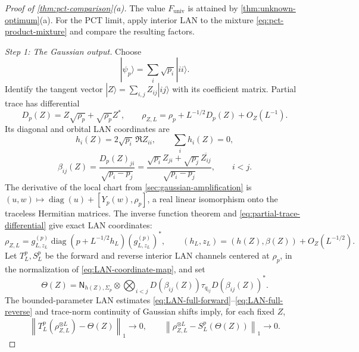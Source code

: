 \documentclass[11pt]{article}
\theoremstyle{remark}
\theoremstyle{plain}
\newcommand{\diag}{\operatorname{diag}}
\newcommand{\ket}[1]{|#1\rangle}
\newcommand{\ot}{\otimes}
\newcommand{\Funiv}{F_{\mathrm{univ}}}
\begin{document}
\begin{proof}[Proof of \cref{thm:pct-comparison}\textup{(a)}]
The value \(\Funiv\) is attained by \cref{thm:unknown-optimum}\textup{(a)}.
For the PCT limit, apply interior LAN to the mixture
\eqref{eq:pct-product-mixture} and compare the resulting factors.

\emph{Step 1: The Gaussian output.}
Choose
\[
  \ket{\psi_p}=\sum_i\sqrt{p_i}\ket{ii}.
\]
Identify the tangent vector \(\ket Z=\sum_{i,j}Z_{ij}\ket{ij}\)
with its coefficient matrix.  Partial trace has differential
\begin{equation}\label{eq:partial-trace-differential}
  D_p(Z)=Z\sqrt{\rho_p}+\sqrt{\rho_p}Z^*,
  \qquad
  \rho_{Z,L}=\rho_p+L^{-1/2}D_p(Z)+O_Z(L^{-1}).
\end{equation}
Its diagonal and orbital LAN coordinates are
\begin{equation}\label{eq:h-Z}
  h_i(Z)=2\sqrt{p_i}\,\Re Z_{ii},
  \qquad \sum_i h_i(Z)=0,
\end{equation}
\begin{equation}\label{eq:beta-Z}
  \beta_{ij}(Z)
  =\frac{D_p(Z)_{ji}}{\sqrt{p_i-p_j}}
  =\frac{\sqrt{p_i}Z_{ji}
            +\sqrt{p_j}\,\overline{Z_{ij}}}
           {\sqrt{p_i-p_j}},
  \qquad i<j.
\end{equation}
The derivative of the local chart from \cref{sec:gaussian-amplification} is
\((u,w)\mapsto\diag(u)+[Y_p(w),\rho_p]\), a real linear isomorphism
onto the traceless Hermitian matrices.  The inverse function theorem
and \eqref{eq:partial-trace-differential} give exact LAN coordinates:
\[
  \rho_{Z,L}
  =g_{L,z_L}^{(p)}\diag(p+L^{-1/2}h_L)(g_{L,z_L}^{(p)})^*,
  \qquad
  (h_L,z_L)=(h(Z),\beta(Z))+O_Z(L^{-1/2}).
\]
Let \(T_L^p,S_L^p\) be the forward and reverse interior LAN channels
centered at \(\rho_p\), in the normalization of
\eqref{eq:LAN-coordinate-map}, and set
\begin{equation}\label{eq:pct-local-gaussian}
  \Theta(Z)
  =\mathsf N_{h(Z),\Sigma_p}\ot
   \bigotimes_{i<j}
   D(\beta_{ij}(Z))\tau_{q_{ij}}D(\beta_{ij}(Z))^*.
\end{equation}
The bounded-parameter LAN estimates
\eqref{eq:LAN-full-forward}--\eqref{eq:LAN-full-reverse} and
trace-norm continuity of Gaussian shifts imply, for each fixed \(Z\),
\[
  \left\|T_L^p(\rho_{Z,L}^{\ot L})-\Theta(Z)\right\|_1\to0,
  \qquad
  \left\|\rho_{Z,L}^{\ot L}-S_L^p(\Theta(Z))\right\|_1\to0.
\]


\end{proof}
\end{document}

